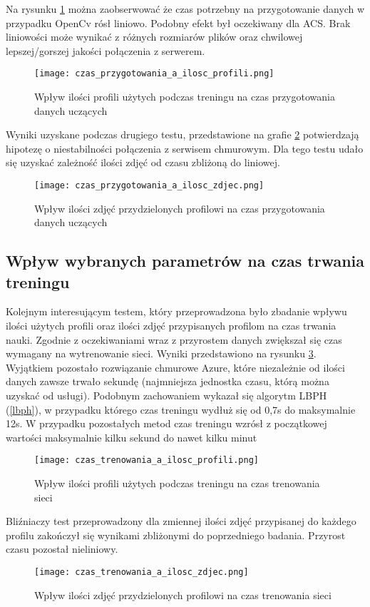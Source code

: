 Na rysunku \ref{fig:czas_p_profile} można zaobserwować że czas potrzebny na przygotowanie danych w przypadku OpenCv rósł liniowo. Podobny efekt był oczekiwany dla ACS. Brak liniowości może wynikać z różnych rozmiarów plików oraz chwilowej lepszej/gorszej jakości połączenia z serwerem.
\begin{figure}[H]
	\centering
	\texttt{[image: czas\_przygotowania\_a\_ilosc\_profili.png]}
	\caption{Wpływ ilości profili użytych podczas treningu na czas przygotowania danych uczących}
	\label{fig:czas_p_profile}
\end{figure}
Wyniki uzyskane podczas drugiego testu, przedstawione na grafie \ref{fig:czas_p_zdjecia} potwierdzają hipotezę o niestabilności połączenia z serwisem chmurowym. Dla tego testu udało się uzyskać zależność ilości zdjęć od czasu zbliżoną do liniowej.
\begin{figure}[H]
	\centering
	\texttt{[image: czas\_przygotowania\_a\_ilosc\_zdjec.png]}
	\caption{Wpływ ilości zdjęć przydzielonych profilowi na czas przygotowania danych uczących}
	\label{fig:czas_p_zdjecia}
\end{figure}

\subsection{Wpływ wybranych parametrów na czas trwania treningu}
Kolejnym interesującym testem, który przeprowadzona było zbadanie wpływu ilości użytych profili oraz ilości zdjęć przypisanych profilom na czas trwania nauki. Zgodnie z oczekiwaniami wraz z przyrostem danych zwiększał się czas wymagany na wytrenowanie sieci. Wyniki przedstawiono na rysunku \ref{fig:czas_t_profile}. Wyjątkiem pozostało rozwiązanie chmurowe Azure, które niezależnie od ilości danych zawsze trwało sekundę (najmniejsza jednostka czasu, którą można uzyskać od usługi). Podobnym zachowaniem wykazał się algorytm LBPH (\ref{lbph}), w przypadku którego czas treningu wydłuż się od 0,7s do maksymalnie 12s. W przypadku pozostałych metod czas treningu wzrósł z początkowej wartości maksymalnie kilku sekund do nawet kilku minut
\begin{figure}[H]
	\centering
	\texttt{[image: czas\_trenowania\_a\_ilosc\_profili.png]}
	\caption{Wpływ ilości profili użytych podczas treningu na czas trenowania sieci}
	\label{fig:czas_t_profile}
\end{figure}
Bliźniaczy test przeprowadzony dla zmiennej ilości zdjęć przypisanej do każdego profilu zakończył się wynikami zbliżonymi do poprzedniego badania. Przyrost czasu pozostał nieliniowy.
\begin{figure}[H]
	\centering
	\texttt{[image: czas\_trenowania\_a\_ilosc\_zdjec.png]}
	\caption{Wpływ ilości zdjęć przydzielonych profilowi na czas trenowania sieci}
	\label{fig:czas_t_zdjecia}
\end{figure}

